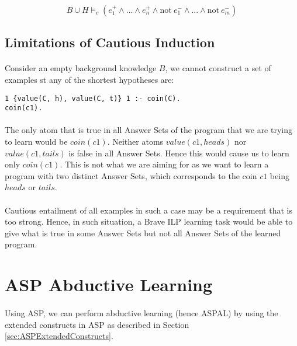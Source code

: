 \documentclass{article}
\theoremstyle{plain}
\theoremstyle{definition}
\begin{document}
\begin{multicols}{2}
$$B \cup H \models_c (e_1^+ \land ... \land e_n^+ \land \text{not}\ e_1^- \land ...  \land \text{not}\ e_m^-)$$

\subsection{Limitations of Cautious Induction}

\paragraph{} Consider an empty background knowledge $B$, we cannot construct a set of examples st any of the shortest hypotheses are:

\begin{lstlisting}
1 {value(C, h), value(C, t)} 1 :- coin(C).
coin(c1).
\end{lstlisting}

\paragraph{} The only atom that is true in all Answer Sets of the program that we are trying to learn would be $coin(c1)$. Neither atoms $value(c1, heads)$ nor $value(c1, tails)$ is false in all Answer Sets. Hence this would cause us to learn only $coin(c1)$. This is not what we are aiming for as we want to learn a program with two distinct Answer Sets, which corresponds to the coin $c1$ being $heads$ or $tails$.

\paragraph{} Cautious entailment of all examples in such a case may be a requirement that is too strong. Hence, in such situation, a Brave ILP learning task would be able to give what is true in some Answer Sets but not all Answer Sets of the learned program.

\section{ASP Abductive Learning}

\paragraph{} Using ASP, we can perform abductive learning (hence ASPAL) by using the extended constructs in ASP as described in Section \ref{sec:ASPExtendedConstructs}. 


\end{multicols}
\end{document}
